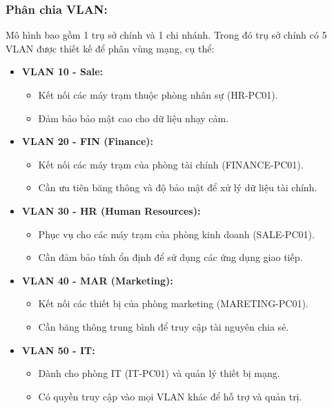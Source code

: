 \documentclass[13pt]{article}
\begin{document}
\subsubsection{Phân chia VLAN:}
Mô hình bao gồm 1 trụ sở chính và 1 chi nhánh. Trong đó trụ sở chính có 5 VLAN được thiết kế để phân vùng mạng, cụ thể:
\begin{itemize}
    \item \textbf{VLAN 10 - Sale:}
    \begin{itemize}
        \item Kết nối các máy trạm thuộc phòng nhân sự (HR-PC01).
        \item Đảm bảo bảo mật cao cho dữ liệu nhạy cảm.
    \end{itemize}

    \item \textbf{VLAN 20 - FIN (Finance):}
    \begin{itemize}
        \item Kết nối các máy trạm của phòng tài chính (FINANCE-PC01).
        \item Cần ưu tiên băng thông và độ bảo mật để xử lý dữ liệu tài chính.
    \end{itemize}
    
    \item \textbf{VLAN 30 - HR (Human Resources):}
    \begin{itemize}
        \item Phục vụ cho các máy trạm của phòng kinh doanh (SALE-PC01).
        \item Cần đảm bảo tính ổn định để sử dụng các ứng dụng giao tiếp.
    \end{itemize}

    \item \textbf{VLAN 40 - MAR (Marketing):}
    \begin{itemize}
        \item Kết nối các thiết bị của phòng marketing (MARETING-PC01).
        \item Cần băng thông trung bình để truy cập tài nguyên chia sẻ.
    \end{itemize}
    
    \item \textbf{VLAN 50 - IT:}
    \begin{itemize}
        \item Dành cho phòng IT (IT-PC01) và quản lý thiết bị mạng.
        \item Có quyền truy cập vào mọi VLAN khác để hỗ trợ và quản trị.
    \end{itemize}
\end{itemize}
\end{document}
